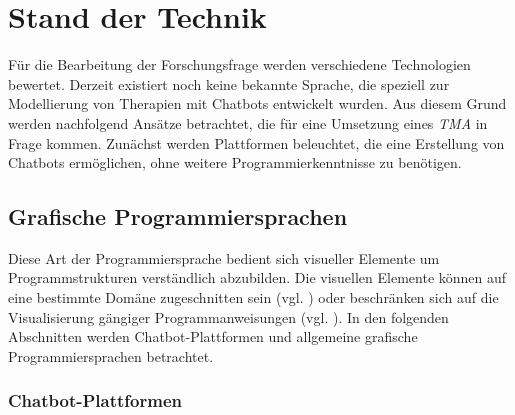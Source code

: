 
\section{Stand der Technik}
\label{ch:Forschungsstand}
Für die Bearbeitung der Forschungsfrage werden verschiedene Technologien bewertet.  Derzeit existiert noch keine bekannte Sprache, die speziell zur Modellierung von Therapien mit Chatbots entwickelt wurden. Aus diesem Grund werden nachfolgend Ansätze betrachtet, die für eine Umsetzung eines \emph{TMA} in Frage kommen. Zunächst werden Plattformen beleuchtet, die eine Erstellung von Chatbots ermöglichen, ohne weitere Programmierkenntnisse zu benötigen. 

\subsection{Grafische Programmiersprachen}
Diese Art der Programmiersprache bedient sich visueller Elemente um Programmstrukturen verständlich abzubilden. Die visuellen Elemente können auf eine bestimmte Domäne zugeschnitten sein (vgl. \cite{WasistLa94:online}) oder beschränken sich auf die Visualisierung gängiger Programmanweisungen (vgl. \cite{BlocklyG57:online}). In den folgenden Abschnitten werden Chatbot-Plattformen und allgemeine grafische Programmiersprachen betrachtet.


\subsubsection{Chatbot-Plattformen}

